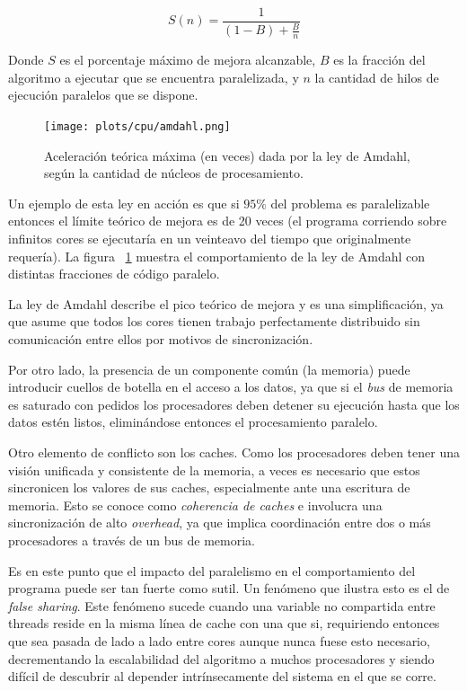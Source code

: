 \begin{equation}
    \label{eq:amdahl}
    S(n) = \frac{1}{(1 - B) + \frac{B}{n}}
\end{equation}

Donde $S$ es el porcentaje m\'aximo de mejora alcanzable, $B$ es la fracci\'on del algoritmo a ejecutar que se encuentra
paralelizada, y $n$ la cantidad de hilos de ejecuci\'on paralelos que se dispone.

\begin{figure}[htbp]
    \centering
    \texttt{[image: plots/cpu/amdahl.png]}
    \caption{Aceleraci\'on te\'orica m\'axima (en veces) dada por la ley de Amdahl, seg\'un la cantidad de n\'ucleos de procesamiento.}
    \label{fig:amdahl_plot}
\end{figure}

Un ejemplo de esta ley en acci\'on es que si $95 \%$ del problema es paralelizable entonces el l\'imite te\'orico de
mejora es de 20 veces (el programa corriendo sobre infinitos cores se ejecutar\'ia en un veinteavo del tiempo que originalmente
requer\'ia). La figura ~\ref{fig:amdahl_plot} muestra el comportamiento de la ley de Amdahl con distintas fracciones de c\'odigo
paralelo.

La ley de Amdahl describe el pico te\'orico de mejora y es una simplificaci\'on, ya que asume que todos los cores tienen
trabajo perfectamente distribuido sin comunicaci\'on entre ellos por motivos de sincronizaci\'on.

Por otro lado, la presencia de un componente com\'un (la memoria) puede introducir cuellos de botella en el acceso a los
datos, ya que si el \textit{bus} de memoria es saturado con pedidos los procesadores deben detener su ejecuci\'on hasta que
los datos est\'en listos, elimin\'andose entonces el procesamiento paralelo.

Otro elemento de conflicto son los caches. Como los procesadores deben tener una visi\'on unificada y consistente de la
memoria, a veces es necesario que estos sincronicen los valores de sus caches, especialmente ante una escritura de memoria.
Esto se conoce como \textit{coherencia de caches} e involucra una sincronizaci\'on de alto \textit{overhead}, ya
que implica coordinaci\'on entre dos o m\'as procesadores a trav\'es de un bus de memoria.

Es en este punto que el impacto del paralelismo en el comportamiento del programa puede ser tan fuerte como sutil. Un fen\'omeno que
ilustra esto es el de \textit{false sharing}. Este fen\'omeno sucede cuando una variable no compartida entre threads
reside en la misma l\'inea de cache con una que si, requiriendo entonces que sea pasada de lado a lado entre cores aunque
nunca fuese esto necesario, decrementando la escalabilidad del algoritmo a muchos procesadores y siendo
dif\'icil de descubrir al depender intr\'insecamente del sistema en el que se corre.

